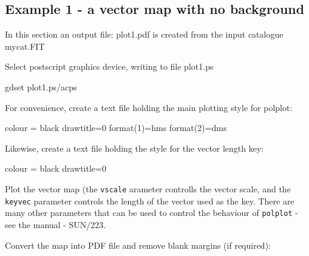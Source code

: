 \subsection{ Example 1 - a vector map with no background}
\label{section:kappa-example1}

In this section an output file: plot1.pdf is created from the input catalogue mycat.FIT

Select postscript graphics device, writing to file plot1.ps

\begin{terminalv}
gdset plot1.ps/acps
\end{terminalv}

For convenience, create a text file holding the main plotting style for polplot:

\begin{terminalv}
colour = black
drawtitle=0
format(1)=hms
format(2)=dms
\end{terminalv}

Likewise, create a text file holding the style for the vector length key:

\begin{terminalv}
colour = black
drawtitle=0
\end{terminalv}


Plot the vector map (the \texttt{vscale} arameter controlls the vector
scale, and the \texttt{keyvec} parameter controls the length of the
vector used as the key. There are many other parameters that can be used
to control the behaviour of \texttt{polplot} - see the \polpack manual - SUN/223.

\begin{terminalv}
\end{terminalv}

Convert the map into PDF file and remove blank margins (if required):

\begin{terminalv}
\end{terminalv}



